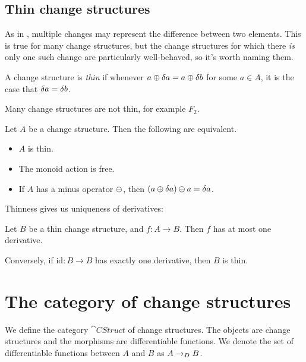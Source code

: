 \subsection{Thin change structures}

As in \textcite{cai2014changes}, multiple changes may represent the difference
between two elements. This is true for many change structures, but the change
structures for which there \emph{is} only one such change are particularly
well-behaved, so it's worth naming them.

\begin{defn}
  A change structure is \textit{thin} if whenever $a \oplus \delta a
  = a \oplus \delta b$ for some $a \in A$, it is the case that $\delta a = \delta b$.
\end{defn}

Many change structures are not thin, for example $F_2$.

\begin{prop}
  Let $A$ be a change structure. Then the following are equivalent.
  \begin{itemize}
    \item $A$ is thin.
    \item The monoid action is free.
    \item If $A$ has a minus operator $\ominus$, then $(a \oplus \delta a)
      \ominus a = \delta a$.
  \end{itemize}
\end{prop}

Thinness gives us uniqueness of derivatives:

\begin{prop}
  Let $B$ be a thin change structure, and $f: A \rightarrow B$. Then $f$ has at
  most one derivative.

  Conversely, if $\textrm{id}: B \rightarrow B$ has exactly one derivative, then
  $B$ is thin.
\end{prop}

\section{The category of change structures}
\label{sec:category}

\begin{defn}
  We define the category $\cat{CStruct}$ of change structures. The objects are
  change structures and the morphisms are differentiable functions. We denote
  the set of differentiable functions between $A$ and $B$ as $A \rightarrow_{D} B$.
\end{defn}

